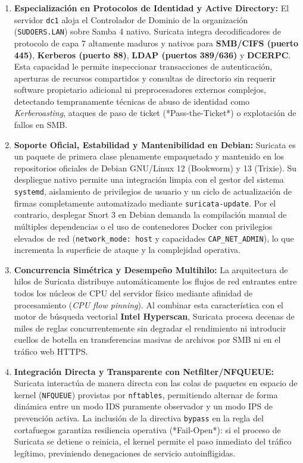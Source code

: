 \begin{enumerate}
  \item \textbf{Especialización en Protocolos de Identidad y Active Directory:} El servidor \texttt{dc1} aloja el Controlador de Dominio de la organización (\texttt{SUDOERS.LAN}) sobre Samba 4 nativo. Suricata integra decodificadores de protocolo de capa 7 altamente maduros y nativos para \textbf{SMB/CIFS (puerto 445)}, \textbf{Kerberos (puerto 88)}, \textbf{LDAP (puertos 389/636)} y \textbf{DCERPC}. Esta capacidad le permite inspeccionar transacciones de autenticación, aperturas de recursos compartidos y consultas de directorio sin requerir software propietario adicional ni preprocesadores externos complejos, detectando tempranamente técnicas de abuso de identidad como \textit{Kerberoasting}, ataques de paso de ticket (*Pass-the-Ticket*) o explotación de fallos en SMB.
  \item \textbf{Soporte Oficial, Estabilidad y Mantenibilidad en Debian:} Suricata es un paquete de primera clase plenamente empaquetado y mantenido en los repositorios oficiales de Debian GNU/Linux 12 (Bookworm) y 13 (Trixie). Su despliegue nativo permite una integración limpia con el gestor del sistema \texttt{systemd}, aislamiento de privilegios de usuario y un ciclo de actualización de firmas completamente automatizado mediante \texttt{suricata-update}. Por el contrario, desplegar Snort 3 en Debian demanda la compilación manual de múltiples dependencias o el uso de contenedores Docker con privilegios elevados de red (\texttt{network\_mode: host} y capacidades \texttt{CAP\_NET\_ADMIN}), lo que incrementa la superficie de ataque y la complejidad operativa.
  \item \textbf{Concurrencia Simétrica y Desempeño Multihilo:} La arquitectura de hilos de Suricata distribuye automáticamente los flujos de red entrantes entre todos los núcleos de CPU del servidor físico mediante afinidad de procesamiento (\textit{CPU flow pinning}). Al combinar esta característica con el motor de búsqueda vectorial \textbf{Intel Hyperscan}, Suricata procesa decenas de miles de reglas concurrentemente sin degradar el rendimiento ni introducir cuellos de botella en transferencias masivas de archivos por SMB ni en el tráfico web HTTPS.
  \item \textbf{Integración Directa y Transparente con Netfilter/NFQUEUE:} Suricata interactúa de manera directa con las colas de paquetes en espacio de kernel (\texttt{NFQUEUE}) provistas por \texttt{nftables}, permitiendo alternar de forma dinámica entre un modo IDS puramente observador y un modo IPS de prevención activa. La inclusión de la directiva \texttt{bypass} en la regla del cortafuegos garantiza resiliencia operativa (*Fail-Open*): si el proceso de Suricata se detiene o reinicia, el kernel permite el paso inmediato del tráfico legítimo, previniendo denegaciones de servicio autoinfligidas.

\end{enumerate}
